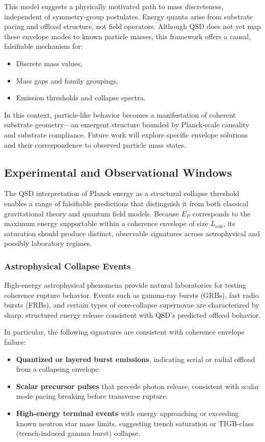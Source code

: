 \documentclass[entropy,article,submit,pdftex,moreauthors]{Definitions/mdpi}
\begin{document}
This model suggests a physically motivated path to mass discreteness, independent of symmetry-group postulates. Energy quanta arise from substrate pacing and offload structure, not field operators. Although QSD does not yet map these envelope modes to known particle masses, this framework offers a causal, falsifiable mechanism for:
\begin{itemize}
  \item Discrete mass values,
  \item Mass gaps and family groupings,
  \item Emission thresholds and collapse spectra.
\end{itemize}

In this context, particle-like behavior becomes a manifestation of coherent substrate geometry—an emergent structure bounded by Planck-scale causality and substrate compliance. Future work will explore specific envelope solutions and their correspondence to observed particle mass states.


\subsection{Experimental and Observational Windows}

The QSD interpretation of Planck energy as a structural collapse threshold enables a range of falsifiable predictions that distinguish it from both classical gravitational theory and quantum field models. Because $E_P$ corresponds to the maximum energy supportable within a coherence envelope of size $L_{\text{coh}}$, its saturation should produce distinct, observable signatures across astrophysical and possibly laboratory regimes.

\subsubsection{Astrophysical Collapse Events}

High-energy astrophysical phenomena provide natural laboratories for testing coherence rupture behavior. Events such as gamma-ray bursts (GRBs), fast radio bursts (FRBs), and certain types of core-collapse supernovae are characterized by sharp, structured energy release consistent with QSD's predicted offload behavior.

In particular, the following signatures are consistent with coherence envelope failure:
\begin{itemize}
  \item \textbf{Quantized or layered burst emissions}, indicating serial or radial offload from a collapsing envelope.
  \item \textbf{Scalar precursor pulses} that precede photon release, consistent with scalar mode pacing breaking before transverse rupture.
  \item \textbf{High-energy terminal events} with energy approaching or exceeding known neutron star mass limits, suggesting trench saturation or TIGB-class (trench-induced gamma burst) collapse.
\end{itemize}
\end{document}
